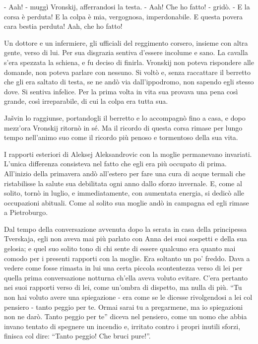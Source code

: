 - Aah! - muggì Vronskij, afferrandosi la testa. - Aah! Che ho fatto! - gridò. - E la corsa è perduta! E la colpa è mia, vergognosa, imperdonabile. E questa povera cara bestia perduta! Aah, che ho fatto! 

Un dottore e un infermiere, gli ufficiali del reggimento corsero, insieme con altra gente, verso di lui. Per sua disgrazia sentiva d'essere incolume e sano. La cavalla s'era spezzata la schiena, e fu deciso di finirla. Vronskij non poteva rispondere alle domande, non poteva parlare con nessuno. Si voltò e, senza raccattare il berretto che gli era saltato di testa, se ne andò via dall'ippodromo, non sapendo egli stesso dove. Si sentiva infelice. Per la prima volta in vita sua provava una pena così grande, così irreparabile, di cui la colpa era tutta sua. 

Jašvin lo raggiunse, portandogli il berretto e lo accompagnò fino a casa, e dopo mezz'ora Vronskij ritornò in sé. Ma il ricordo di questa corsa rimase per lungo tempo nell'animo suo come il ricordo più penoso e tormentoso della sua vita. 

\label{xxvi-1} 

I rapporti esteriori di Aleksej Aleksandrovic con la moglie permanevano invariati. L'unica differenza consisteva nel fatto che egli era più occupato di prima. All'inizio della primavera andò all'estero per fare una cura di acque termali che ristabilisse la salute sua debilitata ogni anno dallo sforzo invernale. E, come al solito, tornò in luglio, e immediatamente, con aumentata energia, si dedicò alle occupazioni abituali. Come al solito sua moglie andò in campagna ed egli rimase a Pietroburgo. 

Dal tempo della conversazione avvenuta dopo la serata in casa della principessa Tverskaja, egli non aveva mai più parlato con Anna dei suoi sospetti e della sua gelosia; e quel suo solito tono di chi sente di essere qualcuno era quanto mai comodo per i presenti rapporti con la moglie. Era soltanto un po' freddo. Dava a vedere come fosse rimasta in lui una certa piccola scontentezza verso di lei per quella prima conversazione notturna ch'ella aveva voluto evitare. C'era pertanto nei suoi rapporti verso di lei, come un'ombra di dispetto, ma nulla di più. ``Tu non hai voluto avere una spiegazione - era come se le dicesse rivolgendosi a lei col pensiero - tanto peggio per te. Ormai sarai tu a pregarmene, ma io spiegazioni non ne darò. Tanto peggio per te'' diceva nel pensiero, come un uomo che abbia invano tentato di spegnere un incendio e, irritato contro i propri inutili sforzi, finisca col dire: ``Tanto peggio! Che bruci pure!''. 

